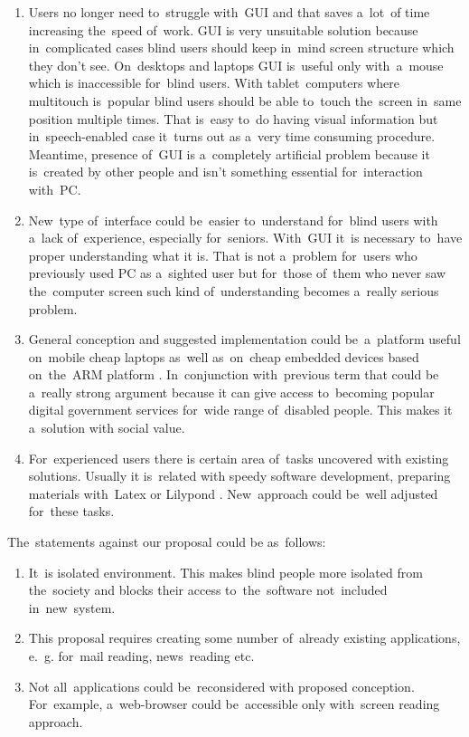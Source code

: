 \documentclass{acm_proc_article-sp}
\begin{document}
\begin{enumerate}

\item {
Users no longer need to~struggle with~GUI and that saves a~lot~of time increasing the~speed of~work. 
GUI is very unsuitable solution 
because in~complicated cases blind users should keep in~mind screen structure which they don't see.
On~desktops and laptops GUI is~useful only with~a~mouse
which is inaccessible for~blind users.
With tablet~computers where multitouch is~popular blind users should 
be able to~touch the~screen in~same position multiple times.
That is~easy to~do  having visual information 
but in~speech-enabled case it~turns out as a~very time consuming procedure. 
Meantime, presence of~GUI is a~completely artificial problem
because it is~created by other people and isn't something essential for~interaction with~PC.
}

\item {
New~type of~interface could be~easier  to~understand 
for~blind users with a~lack of~experience, especially for~seniors.
With~GUI it~is necessary to~have proper understanding what it is.
That is not a~problem for~users who previously used PC as a~sighted user
but for~those of~them who never saw the~computer screen such kind of~understanding 
becomes a~really serious problem.
}

\item {
General conception and suggested implementation could be~a~platform 
useful on~mobile cheap laptops as~well as~on~cheap embedded devices based on~the~ARM platform \cite{arm}.
In~conjunction with~previous term that could be a~really strong argument 
because it can give access to~becoming popular digital  government services 
for~wide range of~disabled people.
This makes it a~solution with social value.
}

\item {
For~experienced users there is certain area of~tasks uncovered with existing solutions.
Usually it is~related with speedy software development,
preparing materials with~Latex \cite{latex} or Lilypond \cite{lilypond}.
New~approach could be~well adjusted for~these tasks.
}

\end{enumerate}

The~statements against our proposal  could be as~follows:

\begin{enumerate}

\item {
It~is isolated environment.
This makes blind people more isolated from the~society 
and blocks their access to~the~software not~included in~new~system.
}

\item {
This proposal requires creating some number of~already existing applications,
e.~g. for~mail reading, news~reading etc.
}

\item {
Not all~applications could be~reconsidered with proposed conception.
For~example, a~web-browser could be~accessible only with~screen reading approach.
}

\end{enumerate}
\end{document}
